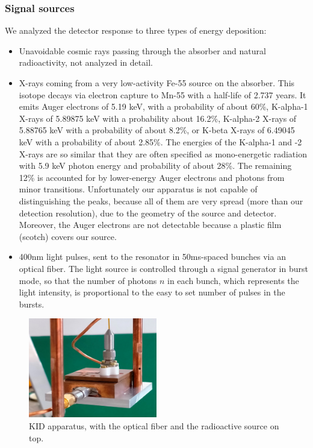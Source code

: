 \documentclass[12pt]{article}
\begin{document}
\subsubsection{Signal sources}
We analyzed the detector response to three types of energy deposition:
\begin{itemize}
\item Unavoidable cosmic rays passing through the absorber and natural radioactivity, not analyzed in detail.
\item X-rays coming from a very low-activity Fe-55 source on the absorber. This isotope decays via electron capture to Mn-55 with a half-life of 2.737 years. It emits Auger electrons of 5.19 keV, with a probability of about 60\%, K-alpha-1 X-rays of 5.89875 keV with a probability about 16.2\%, K-alpha-2 X-rays of 5.88765 keV with a probability of about 8.2\%, or K-beta X-rays of 6.49045 keV with a probability of about 2.85\%. The energies of the K-alpha-1 and -2 X-rays are so similar that they are often specified as mono-energetic radiation with 5.9 keV photon energy and probability of about 28\%. The remaining 12\% is accounted for by lower-energy Auger electrons and photons from minor transitions. Unfortunately our apparatus is not capable of distinguishing the peaks, because all of them are very spread (more than our detection resolution), due to the geometry of the source and detector. Moreover, the Auger electrons are not detectable because a plastic film (scotch) covers our source.
\item 400nm light pulses, sent to the resonator in 50ms-spaced bunches via an optical fiber. The light source is controlled through a signal generator in burst mode, so that the number of photons $n$ in each bunch, which represents the light intensity, is proportional to the easy to set number of pulses in the bursts.
\end{itemize}
\begin{figure}[H] 
        \centering \includegraphics[width=0.5\textwidth]{kid_fibra.jpg}
        \caption{
               KID apparatus, with the optical fiber and the radioactive source on top.
        }
\end{figure}
\end{document}
